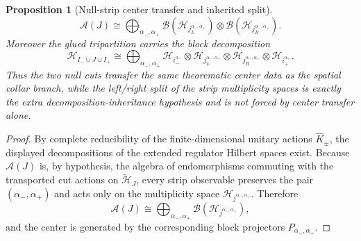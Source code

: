 \documentclass[11pt]{article}
\newtheorem{proposition}[theorem]{Proposition}
\begin{document}
\begin{proposition}[Null-strip center transfer and inherited split]
\[
\mathcal A(J)
\cong
\bigoplus_{\alpha_-,\alpha_+}
\mathcal B(\mathcal H_{j_L^{\alpha_-,\alpha_+}})
\otimes
\mathcal B(\mathcal H_{j_R^{\alpha_-,\alpha_+}}).
\]
Moreover the glued tripartition carries the block decomposition
\[
\mathcal H_{I_-\cup J\cup I_+}
\cong
\bigoplus_{\alpha_-,\alpha_+}
\mathcal H_{i_-^{\alpha_-}}
\otimes
\mathcal H_{j_L^{\alpha_-,\alpha_+}}
\otimes
\mathcal H_{j_R^{\alpha_-,\alpha_+}}
\otimes
\mathcal H_{i_+^{\alpha_+}}.
\]
Thus the two null cuts transfer the same theorematic center data as the spatial collar branch, while the left/right split of the strip multiplicity spaces is exactly the extra decomposition-inheritance hypothesis and is not forced by center transfer alone.
\end{proposition}

\begin{proof}
By complete reducibility of the finite-dimensional unitary actions \(\widehat K_\pm\), the displayed decompositions of the extended regulator Hilbert spaces exist. Because \(\mathcal A(J)\) is, by hypothesis, the algebra of endomorphisms commuting with the transported cut actions on \(\tilde{\mathcal H}_J\), every strip observable preserves the pair \((\alpha_-,\alpha_+)\) and acts only on the multiplicity space \(\mathcal H_{j^{\alpha_-,\alpha_+}}\). Therefore
\[
\mathcal A(J)
\cong
\bigoplus_{\alpha_-,\alpha_+}
\mathcal B(\mathcal H_{j^{\alpha_-,\alpha_+}}),
\]
and the center is generated by the corresponding block projectors \(P_{\alpha_-,\alpha_+}\).


\end{proof}
\end{document}
